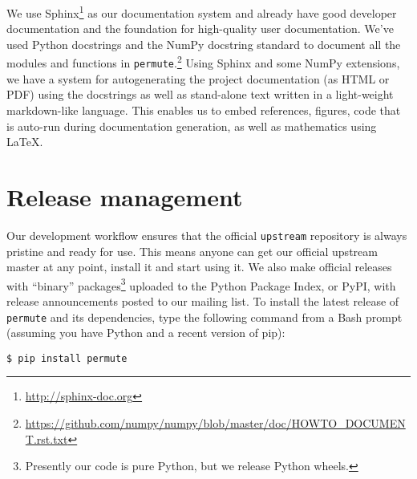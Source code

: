 
We use Sphinx\footnote{\url{http://sphinx-doc.org}} as our documentation system
and already have good developer documentation and the foundation for
high-quality user documentation. We've used Python docstrings and the NumPy
docstring standard to document all the modules and functions in
\texttt{permute}.\footnote{\url{https://github.com/numpy/numpy/blob/master/doc/HOWTO\_DOCUMENT.rst.txt}}
Using Sphinx and some NumPy extensions, we have a system for autogenerating the
project documentation (as HTML or PDF) using the docstrings as well as
stand-alone text written in a light-weight markdown-like language.  This
enables us to embed references, figures, code that is auto-run during
documentation generation, as well as mathematics using \LaTeX.

%

\section{\label{sec:release}Release management}

Our development workflow ensures that the official \texttt{upstream} repository
is always pristine and ready for use.  This means anyone can get our official
upstream master at any point, install it and start using it.  We also 
make official releases with ``binary'' packages\footnote{Presently our code is pure
Python, but we release Python wheels.}
uploaded to the Python Package Index, or PyPI, with release announcements posted
to our mailing list.
To install the latest release of \texttt{permute} and its dependencies, type
the following command from a Bash prompt (assuming you have Python and a recent version of pip): 

\texttt{\$ pip install permute}
